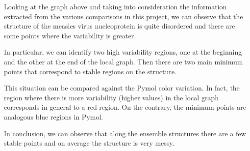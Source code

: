 \medskip
Looking at the graph above and taking into consideration the information extracted from the various comparisons in this project, we can observe that the structure of the measles virus nucleoprotein is quite disordered and there are some points where the variability is greater. 

In particular, we can identify two high variability regions, one at the beginning and the other at the end of the local graph. Then there are two main minimum points that correspond to stable regions on the structure. 

This situation can be compared against the Pymol color variation. In fact, the region where there is more variability (higher values) in the local graph corresponds in general to a red region. On the contrary, the minimum points are analogous blue regions in Pymol.

In conclusion, we can observe that along the ensemble structures there are a few stable points and on average the structure is very messy.

